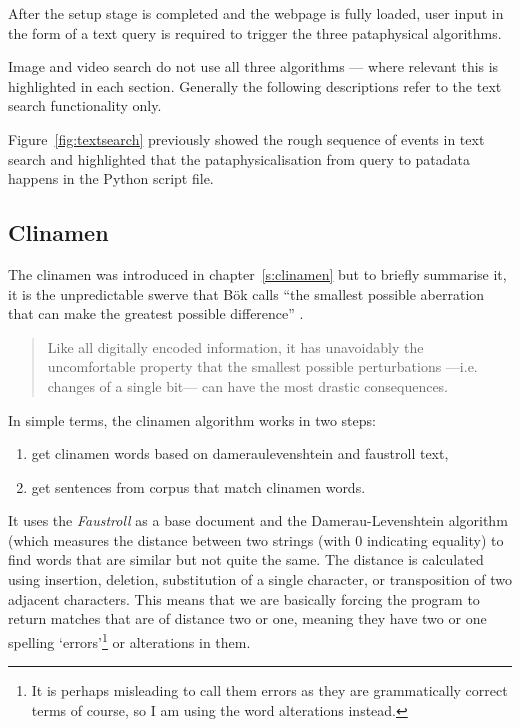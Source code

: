 After the setup stage is completed and the webpage is fully loaded, user input in the form of a text query is required to trigger the three pataphysical algorithms.

Image and video search do not use all three algorithms --- where relevant this is highlighted in each section. Generally the following descriptions refer to the text search functionality only.

Figure~\ref{fig:textsearch} previously showed the rough sequence of events in text search and highlighted that the pataphysicalisation from query to patadata happens in the  Python script file.


\subsection{Clinamen}
\label{s:clinamenalgo}

The clinamen was introduced in chapter~\ref{s:clinamen} but to briefly summarise it, it is the unpredictable swerve that Bök calls ``the smallest possible aberration that can make the greatest possible difference'' \autocite*{Bok2002}.

\begin{quotation}
  Like all digitally encoded information, it has unavoidably the uncomfortable property that the smallest possible perturbations —i.e. changes of a single bit— can have the most drastic consequences. 
\end{quotation}

In simple terms, the clinamen algorithm works in two steps:
\begin{enumerate}
  \item get clinamen words based on dameraulevenshtein and faustroll text,
  \item get sentences from corpus that match clinamen words.
\end{enumerate}

It uses the \textit{Faustroll} \autocite{Jarry1996} as a base document and the Damerau-Leven\-shtein algorithm \autocite{Damerau1964, Levenshtein1966} (which measures the distance between two strings (with 0 indicating equality) to find words that are similar but not quite the same. The distance is calculated using insertion, deletion, substitution of a single character, or transposition of two adjacent characters. This means that we are basically forcing the program to return matches that are of distance two or one, meaning they have two or one spelling `errors'\footnote{It is perhaps misleading to call them errors as they are grammatically correct terms of course, so I am using the word alterations instead.} or alterations in them.

